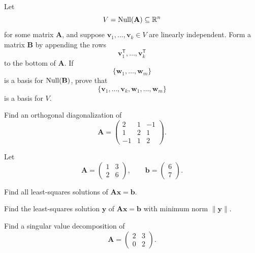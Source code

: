\documentclass[11pt,oneside]{article}
\begin{document}
\begin{problem}
Let
\[
V=\operatorname{Null}(\mathbf A)\subseteq\mathbb{R}^n
\]
for some matrix $\mathbf A$, and suppose $\mathbf v_1,\dots,\mathbf v_k\in V$ are linearly independent. Form a matrix $\mathbf B$ by appending the rows
\[
\mathbf v_1^{\mathsf T},\dots,\mathbf v_k^{\mathsf T}
\]
to the bottom of $\mathbf A$. If
\[
\{\mathbf w_1,\dots,\mathbf w_m\}
\]
is a basis for $\operatorname{Null}(\mathbf B)$, prove that
\[
\{\mathbf v_1,\dots,\mathbf v_k,\mathbf w_1,\dots,\mathbf w_m\}
\]
is a basis for $V$.
\end{problem}

\begin{problem}
Find an orthogonal diagonalization of
\[
\mathbf A=
\begin{pmatrix}
2&1&-1\\
1&2&1\\
-1&1&2
\end{pmatrix}.
\]
\end{problem}

\begin{problem}
Let
\[
\mathbf A=
\begin{pmatrix}
1&3\\
2&6
\end{pmatrix},
\qquad
\mathbf b=
\begin{pmatrix}
6\\7
\end{pmatrix}.
\]
\begin{problemsubparts}
\item Find all least-squares solutions of $\mathbf A\mathbf x=\mathbf b$.
\item Find the least-squares solution $\mathbf y$ of $\mathbf A\mathbf x=\mathbf b$ with minimum norm $\|\mathbf y\|$.
\end{problemsubparts}
\end{problem}

\begin{problem}
Find a singular value decomposition of
\[
\mathbf A=
\begin{pmatrix}
2&3\\
0&2
\end{pmatrix}.
\]
\end{problem}
\end{document}
